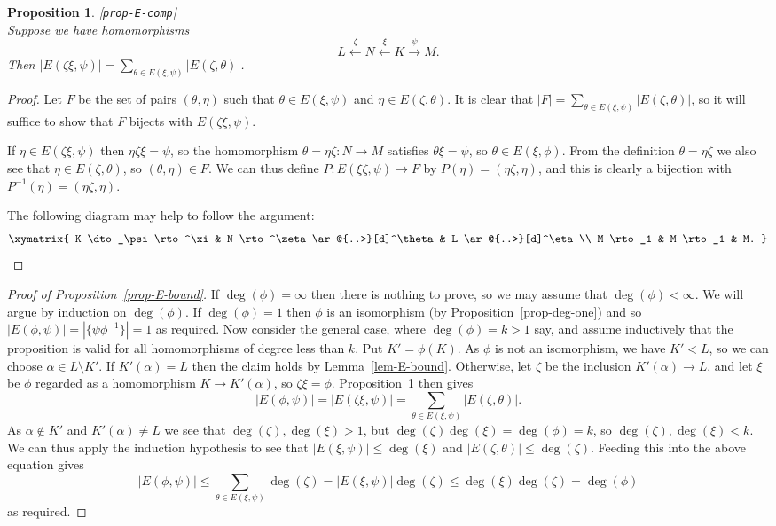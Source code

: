 \documentclass{amsart}
\newcommand{\lbl}[1]{\label{#1}\textup{[\texttt{#1}]}\ \\}
\newcommand{\lbl}{\label}
\newcommand{\al}        {\alpha}
\newcommand{\zt}        {\zeta}
\newcommand{\tht}       {\theta}
\newcommand{\sm}        {\setminus}
\newcommand{\xra}       {\xrightarrow}
\newcommand{\xla}       {\xleftarrow}
\renewcommand{\:}{\colon}
\newtheorem{proposition}[theorem]{Proposition}
\theoremstyle{definition}
\begin{document}
\begin{proposition}\lbl{prop-E-comp}
 Suppose we have homomorphisms
 \[ L \xla{\zt} N \xla{\xi} K \xra{\psi} M. \]
 Then $|E(\zt\xi,\psi)|=\sum_{\tht\in E(\xi,\psi)}|E(\zt,\tht)|$.
\end{proposition}
\begin{proof}
 Let $F$ be the set of pairs $(\tht,\eta)$ such that
 $\tht\in E(\xi,\psi)$ and $\eta\in E(\zt,\tht)$.  It is clear that
 $|F|=\sum_{\tht\in E(\xi,\psi)}|E(\zt,\tht)|$, so it will suffice to
 show that $F$ bijects with $E(\zt\xi,\psi)$.  

 If $\eta\in E(\zt\xi,\psi)$ then $\eta\zt\xi=\psi$, so the
 homomorphism $\tht=\eta\zt\:N\to M$ satisfies $\tht\xi=\psi$, so
 $\tht\in E(\xi,\phi)$.  From the definition $\tht=\eta\zt$ we also
 see that $\eta\in E(\zt,\tht)$, so $(\tht,\eta)\in F$.  We can thus
 define $P\:E(\xi\zt,\psi)\to F$ by $P(\eta)=(\eta\zt,\eta)$, and this
 is clearly a bijection with $P^{-1}(\eta)=(\eta\zt,\eta)$.  

 The following diagram may help to follow the argument:
 \[ \xymatrix{ 
   K \dto_\psi \rto^\xi &
   N \rto^\zt \ar@{..>}[d]^\tht & 
   L \ar@{..>}[d]^\eta \\
   M \rto_1 & 
   M \rto_1 &
   M.
 } \] 
\end{proof}

\begin{proof}[Proof of Proposition~\ref{prop-E-bound}]
 If $\deg(\phi)=\infty$ then there is nothing to prove, so we may
 assume that $\deg(\phi)<\infty$.  We will argue by induction on
 $\deg(\phi)$.  If $\deg(\phi)=1$ then $\phi$ is an isomorphism (by
 Proposition~\ref{prop-deg-one}) and so
 $|E(\phi,\psi)|=|\{\psi\phi^{-1}\}|=1$ as required.  Now consider the
 general case, where $\deg(\phi)=k>1$ say, and assume inductively that
 the proposition is valid for all homomorphisms of degree less than
 $k$.  Put $K'=\phi(K)$.  As $\phi$ is not an isomorphism, we have
 $K'<L$, so we can choose $\al\in L\sm K'$.  If $K'(\al)=L$ then the
 claim holds by Lemma~\ref{lem-E-bound}.  Otherwise, let $\zt$ be the
 inclusion $K'(\al)\to L$, and let $\xi$ be $\phi$ regarded as a
 homomorphism $K\to K'(\al)$, so $\zt\xi=\phi$.
 Proposition~\ref{prop-E-comp} then gives 
 \[ |E(\phi,\psi)| = |E(\zt\xi,\psi)| =
      \sum_{\tht\in E(\xi,\psi)}|E(\zt,\tht)|.
 \]
 As $\al\not\in K'$ and $K'(\al)\neq L$ we see that
 $\deg(\zt),\deg(\xi)>1$, but $\deg(\zt)\deg(\xi)=\deg(\phi)=k$, so
 $\deg(\zt),\deg(\xi)<k$.  We can thus apply the induction hypothesis
 to see that $|E(\xi,\psi)|\leq\deg(\xi)$ and
 $|E(\zt,\tht)|\leq\deg(\zt)$.  Feeding this into the above equation
 gives 
 \[ |E(\phi,\psi)|\leq \sum_{\tht\in E(\xi,\psi)}\deg(\zt) 
     = |E(\xi,\psi)|\deg(\zt) \leq \deg(\xi)\deg(\zt) = \deg(\phi)
 \]
 as required.
\end{proof}
\end{document}
